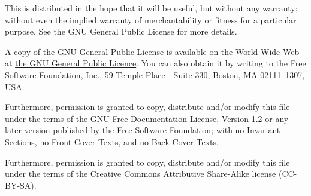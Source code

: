 \documentclass[12pt]{book}
\begin{document}
This is distributed in the hope that it will be useful, but without
any warranty; without even the implied warranty of merchantability or
fitness for a particular purpose. See the GNU General Public License
for more details.

A copy of the GNU General Public License is available on the World
Wide Web at \href{http://www.gnu.org/copyleft/gpl.html}{the GNU
General Public Licence}. You can also obtain it by writing to the Free
Software Foundation, Inc., 59 Temple Place - Suite 330, Boston, MA
02111--1307, USA.


Furthermore, permission is granted to copy, distribute and/or modify
this file under the terms of the GNU Free Documentation License,
Version 1.2 or any later version published by the Free Software
Foundation; with no Invariant Sections, no Front-Cover Texts, and no
Back-Cover Texts.

Furthermore, permission is granted to copy, distribute and/or modify
this file under the terms of the Creative Commons Attributive
Share-Alike license (CC-BY-SA).


\printindex
\end{document}
